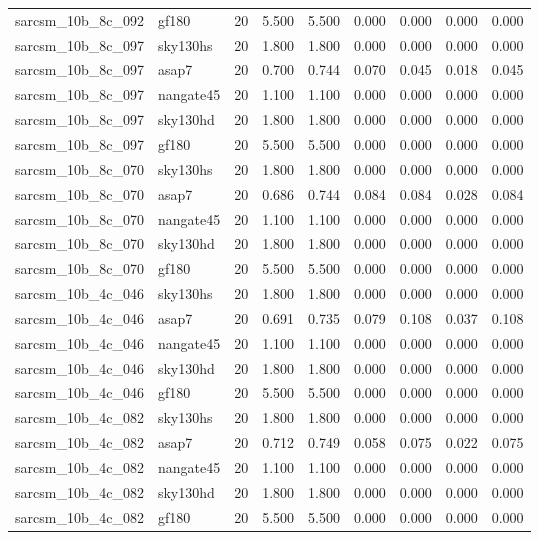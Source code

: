 \begin{tabular}{llrrrrrrr}
sarcsm\_10b\_8c\_092 & gf180 & 20 & 5.500 & 5.500 & 0.000 & 0.000 & 0.000 & 0.000 \\
sarcsm\_10b\_8c\_097 & sky130hs & 20 & 1.800 & 1.800 & 0.000 & 0.000 & 0.000 & 0.000 \\
sarcsm\_10b\_8c\_097 & asap7 & 20 & 0.700 & 0.744 & 0.070 & 0.045 & 0.018 & 0.045 \\
sarcsm\_10b\_8c\_097 & nangate45 & 20 & 1.100 & 1.100 & 0.000 & 0.000 & 0.000 & 0.000 \\
sarcsm\_10b\_8c\_097 & sky130hd & 20 & 1.800 & 1.800 & 0.000 & 0.000 & 0.000 & 0.000 \\
sarcsm\_10b\_8c\_097 & gf180 & 20 & 5.500 & 5.500 & 0.000 & 0.000 & 0.000 & 0.000 \\
sarcsm\_10b\_8c\_070 & sky130hs & 20 & 1.800 & 1.800 & 0.000 & 0.000 & 0.000 & 0.000 \\
sarcsm\_10b\_8c\_070 & asap7 & 20 & 0.686 & 0.744 & 0.084 & 0.084 & 0.028 & 0.084 \\
sarcsm\_10b\_8c\_070 & nangate45 & 20 & 1.100 & 1.100 & 0.000 & 0.000 & 0.000 & 0.000 \\
sarcsm\_10b\_8c\_070 & sky130hd & 20 & 1.800 & 1.800 & 0.000 & 0.000 & 0.000 & 0.000 \\
sarcsm\_10b\_8c\_070 & gf180 & 20 & 5.500 & 5.500 & 0.000 & 0.000 & 0.000 & 0.000 \\
sarcsm\_10b\_4c\_046 & sky130hs & 20 & 1.800 & 1.800 & 0.000 & 0.000 & 0.000 & 0.000 \\
sarcsm\_10b\_4c\_046 & asap7 & 20 & 0.691 & 0.735 & 0.079 & 0.108 & 0.037 & 0.108 \\
sarcsm\_10b\_4c\_046 & nangate45 & 20 & 1.100 & 1.100 & 0.000 & 0.000 & 0.000 & 0.000 \\
sarcsm\_10b\_4c\_046 & sky130hd & 20 & 1.800 & 1.800 & 0.000 & 0.000 & 0.000 & 0.000 \\
sarcsm\_10b\_4c\_046 & gf180 & 20 & 5.500 & 5.500 & 0.000 & 0.000 & 0.000 & 0.000 \\
sarcsm\_10b\_4c\_082 & sky130hs & 20 & 1.800 & 1.800 & 0.000 & 0.000 & 0.000 & 0.000 \\
sarcsm\_10b\_4c\_082 & asap7 & 20 & 0.712 & 0.749 & 0.058 & 0.075 & 0.022 & 0.075 \\
sarcsm\_10b\_4c\_082 & nangate45 & 20 & 1.100 & 1.100 & 0.000 & 0.000 & 0.000 & 0.000 \\
sarcsm\_10b\_4c\_082 & sky130hd & 20 & 1.800 & 1.800 & 0.000 & 0.000 & 0.000 & 0.000 \\
sarcsm\_10b\_4c\_082 & gf180 & 20 & 5.500 & 5.500 & 0.000 & 0.000 & 0.000 & 0.000 \\

\end{tabular}
